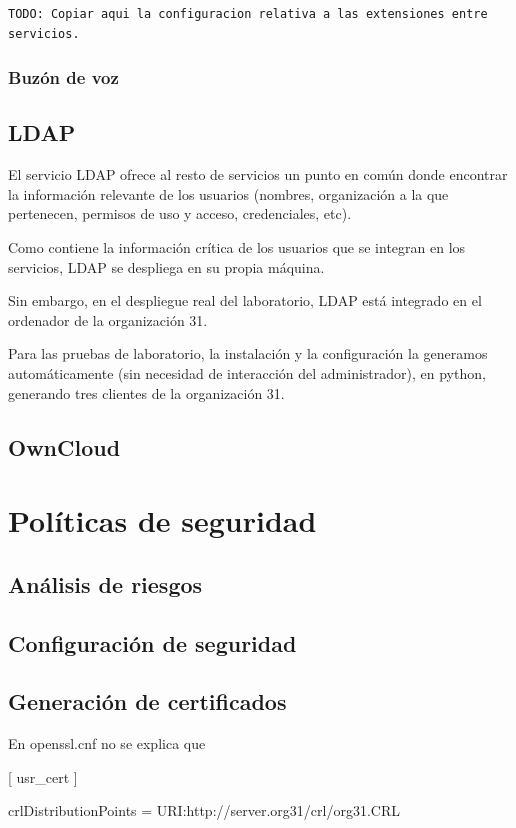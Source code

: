 \documentclass[]{article}
\begin{document}
\begin{lstlisting}
TODO: Copiar aqui la configuracion relativa a las extensiones entre servicios.
\end{lstlisting}

\subsubsection{Buzón de voz}

\subsection{LDAP}
El servicio LDAP ofrece al resto de servicios un punto en común donde encontrar la información relevante de los usuarios (nombres,
organización a la que pertenecen, permisos de uso y acceso, credenciales, etc).

Como contiene la información crítica de los usuarios que se integran en los servicios, LDAP se despliega en su propia máquina.

Sin embargo, en el despliegue real del laboratorio, LDAP está integrado en el ordenador de la organización 31.

Para las pruebas de laboratorio, la instalación y la configuración la generamos automáticamente (sin necesidad de
interacción del administrador), en python, generando tres clientes de la organización 31.


\subsection{OwnCloud}

\section{Políticas de seguridad}

\subsection{Análisis de riesgos}

\subsection{Configuración de seguridad}

\subsection{Generación de certificados}
En openssl.cnf no se explica que %

[ usr_cert ]

crlDistributionPoints = URI:http://server.org31/crl/org31.CRL
\end{document}

